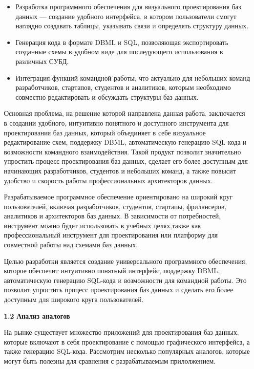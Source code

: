 \begin{itemize}
    \item Разработка программного обеспечения для визуального проектирования баз данных — создание удобного интерфейса, в котором пользователи смогут наглядно создавать таблицы, указывать связи и определять структуру данных.
    \item Генерация кода в формате DBML и SQL, позволяющая экспортировать созданные схемы в удобном виде для последующего использования в различных СУБД.
    \item Интеграция функций командной работы, что актуально для небольших команд разработчиков, стартапов, студентов и аналитиков, которым необходимо совместно редактировать и обсуждать структуры баз данных.
\end{itemize}

Основная проблема, на решение которой направлена данная работа, заключается в создании удобного, интуитивно понятного и доступного инструмента для проектирования баз данных, который объединяет в себе визуальное редактирование схем, поддержку DBML, автоматическую генерацию SQL-кода и возможности командного взаимодействия. Такой продукт позволит значительно упростить процесс проектирования баз данных, сделает его более доступным для начинающих разработчиков, студентов и небольших команд, а также повысит удобство и скорость работы профессиональных архитекторов данных.

Разрабатываемое программное обеспечение ориентировано на широкий круг пользователей, включая разработчиков, студентов, стартапы, фрилансеров, аналитиков и архитекторов баз данных. В зависимости от потребностей, инструмент можно будет использовать в учебных целях,также как профессиональный инструмент для проектирования или платформу для совместной работы над схемами баз данных.

Целью разработки является создание универсального программного обеспечения, которое обеспечит интуитивно понятный интерфейс, поддержку DBML, автоматическую генерацию SQL-кода и возможности для командной работы. Это позволит упростить процесс проектирования баз
данных и сделать его более доступным для широкого круга пользователей.

\newpage

\textbf{1.2 Анализ аналогов}

На рынке существует множество приложений для проектирования баз данных, которые включают в себя проектирование с помощью графического интерфейса, а также генерацию SQL-кода. Рассмотрим несколько популярных аналогов, которые могут быть полезны для сравнения с разрабатываемым прилолжением.

